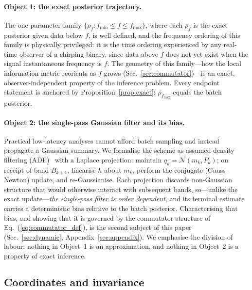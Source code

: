 \documentclass[twocolumn,prd,showpacs,superscriptaddress]{revtex4-2}
\newcommand{\fmin}{f_{\text{min}}}
\newcommand{\fmax}{f_{\text{max}}}
\newcommand{\secref}[1]{Sec.~\ref{sec:#1}}
\newcommand{\eqnref}[1]{Eq.~(\ref{eq:#1})}
\begin{document}
\paragraph{Object 1: the exact posterior trajectory.}
The one-parameter family $\{\rho_f : \fmin \le f \le \fmax\}$, where
each $\rho_f$ is the exact posterior given data below $f$, is
well defined, and the frequency ordering of this family is physically
privileged: it is the time ordering experienced by any real-time
observer of a chirping binary, since data above $f$ does not yet exist
when the signal instantaneous frequency is $f$.  The geometry of this
family---how the local information metric reorients as $f$ grows
(\secref{commutator})---is an exact, observer-independent property of
the inference problem.  Every endpoint statement is anchored by
Proposition~\ref{prop:exact}: $\rho_{\fmax}$ equals the batch
posterior.

\paragraph{Object 2: the single-pass Gaussian filter and its bias.}
Practical low-latency analyses cannot afford batch sampling and instead
propagate a Gaussian summary.  We formalise the scheme as
assumed-density filtering (ADF)~\cite{minka2001ep,opper1998online} with
a Laplace projection: maintain
$q_k = \mathcal{N}(m_k, P_k)$; on receipt of band $B_{k+1}$, linearise
$h$ about $m_k$, perform the conjugate (Gauss--Newton) update, and
re-Gaussianise.  Each projection discards non-Gaussian structure that
would otherwise interact with subsequent bands, so---unlike the exact
update---\emph{the single-pass filter is order dependent}, and its
terminal estimate carries a deterministic bias relative to the batch
posterior.  Characterising that bias, and showing that it is governed by
the commutator structure of \eqnref{commutator_def}, is the second
subject of this paper (\secref{dynamic}, Appendix~\ref{sec:appendix}).
We emphasise the division of labour: nothing in Object~1 is an
approximation, and nothing in Object~2 is a property of exact
inference.

\subsection{Coordinates and invariance}
\label{sec:coordinates}
\end{document}

